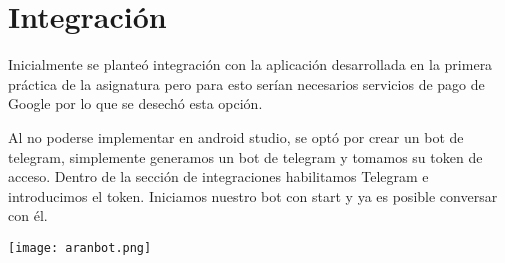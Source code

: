 \section{Integración}

Inicialmente se planteó integración con la aplicación desarrollada en la primera práctica de la asignatura pero para esto serían necesarios servicios de pago de Google por lo que se desechó esta opción.

Al no poderse implementar en android studio, se optó por crear un bot de telegram, simplemente generamos un bot de telegram y tomamos su token de acceso. Dentro de la sección de integraciones habilitamos Telegram e introducimos el token. Iniciamos nuestro bot con start y ya es posible conversar con él.

\texttt{[image: aranbot.png]}\\[0.7 cm]
